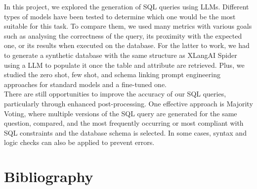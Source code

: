 \documentclass[12pt,a4paper]{article}
\begin{document}
In this project, we explored the generation of SQL queries using LLMs. Different types of models have been tested to determine which one would be the most suitable for this task. To compare them, we used many metrics with various goals such as analysing the correctness of the query, its proximity with the expected one, or its results when executed on the database. For the latter to work, we had to generate a synthetic database with the same structure as XLangAI Spider using a LLM to populate it once the table and attribute are retrieved. Plus, we studied the zero shot, few shot, and schema linking prompt engineering approaches for standard models and a fine-tuned one.\\
There are still opportunities to improve the accuracy of our SQL queries, particularly through enhanced post-processing. One effective approach is Majority Voting, where multiple versions of the SQL query are generated for the same question, compared, and the most frequently occurring or most compliant with SQL constraints and the database schema is selected. In some cases, syntax and logic checks can also be applied to prevent errors.

\section*{Bibliography}


\end{document}
